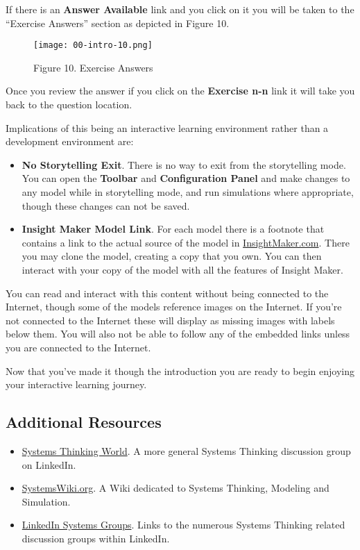 \documentclass[]{memoir}
\let\Oldincludegraphics\includegraphics
\renewcommand{\includegraphics}[1]{\Oldincludegraphics[max size={\textwidth}{\textheight}]{#1}}
\begin{document}
If there is an \textbf{Answer Available} link and you click on it you
will be taken to the ``Exercise Answers'' section as depicted in Figure
10.

\begin{figure}[htbp]
\centering
\texttt{[image: 00-intro-10.png]}
\caption{Figure 10. Exercise Answers}
\end{figure}

Once you review the answer if you click on the \textbf{Exercise n-n}
link it will take you back to the question location.

Implications of this being an interactive learning environment rather
than a development environment are:

\begin{itemize}
\itemsep1pt\parskip0pt
\item
  \textbf{No Storytelling Exit}. There is no way to exit from the
  storytelling mode. You can open the \textbf{Toolbar} and
  \textbf{Configuration Panel} and make changes to any model while in
  storytelling mode, and run simulations where appropriate, though these
  changes can not be saved.
\item
  \textbf{Insight Maker Model Link}. For each model there is a footnote
  that contains a link to the actual source of the model in
  \href{http://insightmaker.com/}{InsightMaker.com}. There you may clone
  the model, creating a copy that you own. You can then interact with
  your copy of the model with all the features of Insight Maker.
\end{itemize}

You can read and interact with this content without being connected to
the Internet, though some of the models reference images on the
Internet. If you're not connected to the Internet these will display as
missing images with labels below them. You will also not be able to
follow any of the embedded links unless you are connected to the
Internet.

Now that you've made it though the introduction you are ready to begin
enjoying your interactive learning journey.

\subsection{Additional Resources}

\begin{itemize}
\itemsep1pt\parskip0pt
\item
  \href{http://www.linkedin.com/groups/Systems-Thinking-World-2639211}{Systems
  Thinking World}. A more general Systems Thinking discussion group on
  LinkedIn.
\item
  \href{http://www.systemswiki.org/}{SystemsWiki.org}. A Wiki dedicated
  to Systems Thinking, Modeling and Simulation.
\item
  \href{http://webbrain.com/u/1521}{LinkedIn Systems Groups}. Links to
  the numerous Systems Thinking related discussion groups within
  LinkedIn.
\end{itemize}
\end{document}
